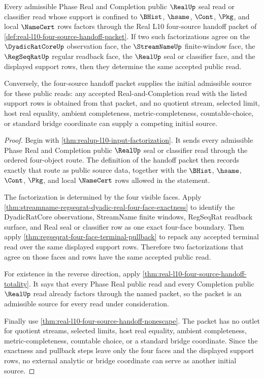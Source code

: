 \begin{theorem}
\label{thm:real-l10-four-source-handoff-initiality}
Every admissible Phase Real and Completion public $\RealUp$ seal read or classifier read whose support is confined to $\BHist$, $\hsame$, $\Cont$, $\Pkg$, and local $\NameCert$ rows factors through the Real L10 four-source handoff packet of \autoref{def:real-l10-four-source-handoff-packet}. If two such factorizations agree on the $\DyadicRatCoreUp$ observation face, the $\StreamNameUp$ finite-window face, the $\RegSeqRatUp$ regular readback face, the $\RealUp$ seal or classifier face, and the displayed support rows, then they determine the same accepted public read.

Conversely, the four-source handoff packet supplies the initial admissible source for these public reads: any accepted Real-and-Completion read with the listed support rows is obtained from that packet, and no quotient stream, selected limit, host real equality, ambient completeness, metric-completeness, countable-choice, or standard bridge coordinate can supply a competing initial source.
\end{theorem}
\begin{proof}
Begin with \autoref{thm:realup-l10-input-factorization}. It sends every admissible Phase Real and Completion public $\RealUp$ seal or classifier read through the ordered four-object route. The definition of the handoff packet then records exactly that route as public source data, together with the $\BHist$, $\hsame$, $\Cont$, $\Pkg$, and local $\NameCert$ rows allowed in the statement.

The factorization is determined by the four visible faces. Apply \autoref{thm:streamname-regseqrat-dyadic-real-four-face-exactness} to identify the DyadicRatCore observations, StreamName finite windows, RegSeqRat readback surface, and Real seal or classifier row as one exact four-face boundary. Then apply \autoref{thm:regseqrat-four-face-terminal-pullback} to repack any accepted terminal read over the same displayed support rows. Therefore two factorizations that agree on those faces and rows have the same accepted public read.

For existence in the reverse direction, apply \autoref{thm:real-l10-four-source-handoff-totality}. It says that every Phase Real public read and every Completion public $\RealUp$ read already factors through the named packet, so the packet is an admissible source for every read under consideration.

Finally use \autoref{thm:real-l10-four-source-handoff-nonescape}. The packet has no outlet for quotient streams, selected limits, host real equality, ambient completeness, metric-completeness, countable choice, or a standard bridge coordinate. Since the exactness and pullback steps leave only the four faces and the displayed support rows, no external analytic or bridge coordinate can serve as another initial source.
\end{proof}

